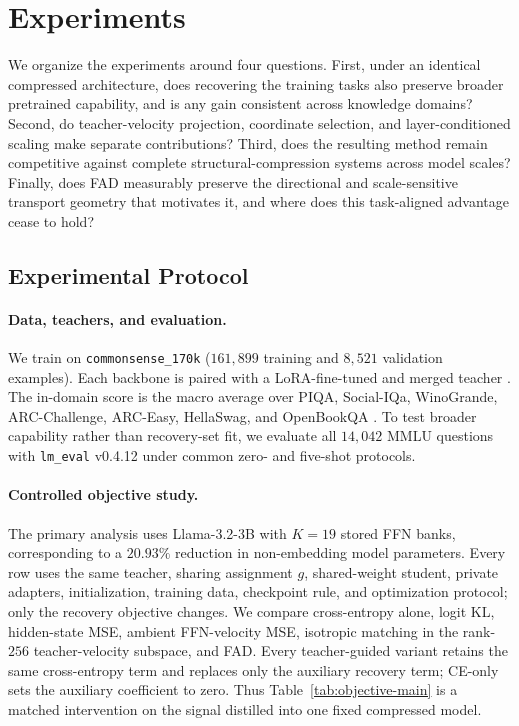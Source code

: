 \documentclass{article}
\theoremstyle{plain}
\theoremstyle{definition}
\theoremstyle{remark}
\begin{document}
\providecommand{\tbd}{\textit{TBD}}


\section{Experiments}
\label{sec:experiments}

We organize the experiments around four questions.  First, under an identical
compressed architecture, does recovering the training tasks also preserve broader
pretrained capability, and is any gain consistent across knowledge domains?
Second, do teacher-velocity projection, coordinate selection, and
layer-conditioned scaling make separate contributions?  Third, does the resulting
method remain competitive against complete structural-compression systems across
model scales?  Finally, does FAD measurably preserve the directional and scale-sensitive
transport geometry that motivates it, and where does this task-aligned advantage
cease to hold?

\subsection{Experimental Protocol}
\label{sec:setup}

\paragraph{Data, teachers, and evaluation.}
We train on \texttt{commonsense\_170k} ($161{,}899$ training and $8{,}521$
validation examples).  Each backbone is paired with a LoRA-fine-tuned and merged
teacher \citep{hu2022lora}.  The in-domain score is the macro average over PIQA,
Social-IQa, WinoGrande, ARC-Challenge, ARC-Easy, HellaSwag, and OpenBookQA
\citep{bisk2020piqa,sap2019socialiqa,sakaguchi2021winogrande,clark2018think,
zellers2019hellaswag,mihaylov2018openbookqa}.  To test broader capability rather
than recovery-set fit, we evaluate all $14{,}042$ MMLU questions
\citep{hendrycks2021measuring} with \texttt{lm\_eval} v0.4.12 under common zero-
and five-shot protocols.

\paragraph{Controlled objective study.}
The primary analysis uses Llama-3.2-3B with $K=19$ stored FFN banks, corresponding
to a $20.93\%$ reduction in non-embedding model parameters.  Every row uses the
same teacher, sharing assignment $g$, shared-weight student, private adapters,
initialization, training data, checkpoint rule, and optimization protocol; only
the recovery objective changes.  We compare cross-entropy alone, logit KL,
hidden-state MSE, ambient FFN-velocity MSE, isotropic matching in the rank-$256$
teacher-velocity subspace, and FAD.  Every teacher-guided variant retains the
same cross-entropy term and replaces only the auxiliary recovery term; CE-only
sets the auxiliary coefficient to zero.  Thus Table~\ref{tab:objective-main} is
a matched intervention on the signal distilled into one fixed compressed model.
\end{document}
